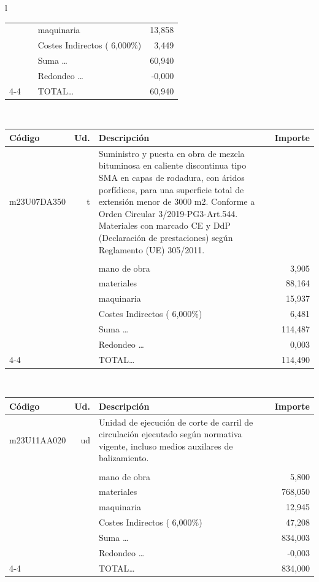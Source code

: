 \documentclass{book}%
\begin{document}
\begin{longtable}{l}
\begin{tabular}{l r p{60mm} r}
&&maquinaria&    13,858\\%
&&Costes Indirectos (     6,000\%)&     3,449\\%
&&Suma \ldots&    60,940\\%
&&Redondeo \ldots&    {-}0,000\\%
\cline{4-4}%
&&TOTAL\ldots&    60,940\\%
\end{tabular}\\%
\begin{tabular}{l r p{60mm} r}%
Código&Ud.&Descripción&Importe\\%
\hline%
m23U07DA350&t&Suministro y puesta en obra de mezcla bituminosa en caliente discontinua tipo SMA en capas de rodadura, con áridos porfídicos, para una superficie total de extensión menor de 3000 m2. Conforme a Orden Circular 3/2019{-}PG3{-}Art.544. Materiales con marcado CE y DdP (Declaración de prestaciones) según Reglamento (UE) 305/2011.&\\%
&&&\\%
&&mano de obra&     3,905\\%
&&materiales&    88,164\\%
&&maquinaria&    15,937\\%
&&Costes Indirectos (     6,000\%)&     6,481\\%
&&Suma \ldots&   114,487\\%
&&Redondeo \ldots&     0,003\\%
\cline{4-4}%
&&TOTAL\ldots&   114,490\\%
\end{tabular}\\%
\begin{tabular}{l r p{60mm} r}%
Código&Ud.&Descripción&Importe\\%
\hline%
m23U11AA020&ud&Unidad de ejecución de corte de carril de circulación ejecutado según normativa vigente, incluso medios auxilares de balizamiento.&\\%
&&&\\%
&&mano de obra&     5,800\\%
&&materiales&   768,050\\%
&&maquinaria&    12,945\\%
&&Costes Indirectos (     6,000\%)&    47,208\\%
&&Suma \ldots&   834,003\\%
&&Redondeo \ldots&    {-}0,003\\%
\cline{4-4}%
&&TOTAL\ldots&   834,000\\%
\end{tabular}\\%

\end{longtable}
\end{document}
